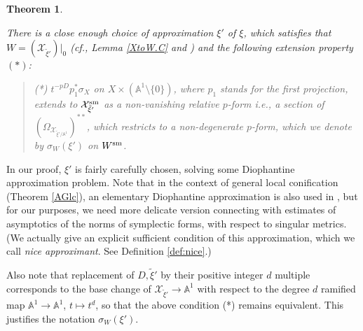 \documentclass[12pt,a4paper]{amsart}
\newtheorem{Thm}{Theorem}[section]
\theoremstyle{remark}
\theoremstyle{definition}
\def\A{\mathbb{A}}
\def\X{\mathcal{X}}
\begin{document}
\begin{Thm}
\begin{enumerate}
    There is a close enough choice of approximation $\xi'$ of $\xi$, which satisfies 
    that $W=(\mathcal{X}_{\tilde{\xi}'})|_0$ 
    (cf., Lemma \ref{XtoW.C} and \cite{Od24b, Od24c}) 
    and 
    the following extension property $(*)$: 
    \begin{quote}(*)
    $t^{-pD}p_1^*\sigma_X$ on $X\times (\A^1\setminus \{0\})$, 
    where $p_1$ stands for the first projection, 
    extends to $\X_{\tilde{\xi}'}^{\rm sm}$ as 
    a non-vanishing relative $p$-form i.e., 
    a section of $(\Omega_{\X_{\tilde{\xi}'/\A^1}})^{**}$, 
    which restricts to a non-degenerate $p$-form, 
    which we denote by  $\sigma_W(\xi')$ on 
    $W^{\rm sm}$. 
    \end{quote}
    \end{enumerate}
    \end{Thm}
    
    In our proof, $\xi'$ is fairly carefully chosen, 
    solving some Diophantine approximation problem. 
    Note that in the context of general local conification 
    (Theorem \ref{AGlc}), an elementary 
    Diophantine approximation is also used in \cite[\S 2.2]{LX}, 
    but for our purposes, we need more delicate version 
    connecting with estimates of asymptotics of the 
    norms of symplectic forms, 
    with respect to singular metrics. 
    (We actually give an explicit sufficient condition of this approximation, which we call {\it nice approximant}. See Definition \ref{def:nice}.) 
    
    Also note that replacement of  $D, \tilde{\xi}'$ by 
    their positive integer $d$ multiple corresponds 
    to the base change of ${\X}_{\tilde{\xi}'}\to \A^1$ 
    with respect to the degree $d$ ramified map 
    $\A^1\to \A^1$, $t\mapsto t^d$, so that the above condition 
    (*) remains equivalent. This justifies the notation 
    $\sigma_W(\xi')$. 
\end{document}
